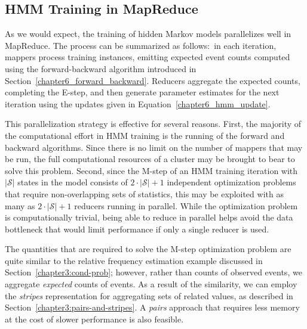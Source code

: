 \subsection{HMM Training in MapReduce}

As we would expect, the training of hidden Markov models parallelizes
well in MapReduce.  The process can be summarized as follows:\ in each
iteration, mappers process training instances, emitting expected event
counts computed using the forward-backward algorithm introduced in
Section~\ref{chapter6_forward_backward}.  Reducers aggregate the
expected counts, completing the E-step, and then generate parameter
estimates for the next iteration using the updates given in
Equation~\ref{chapter6_hmm_update}.

This parallelization strategy is effective for several reasons.
First, the majority of the computational effort in HMM training is the
running of the forward and backward algorithms.  Since there is no
limit on the number of mappers that may be run, the full computational
resources of a cluster may be brought to bear to solve this problem.
Second, since the M-step of an HMM training iteration with
$|\mathcal{S}|$ states in the model consists of $2\cdot |\mathcal{S}|
+ 1$ independent optimization problems that require non-overlapping
sets of statistics, this may be exploited with as many as $2\cdot
|\mathcal{S}| + 1$ reducers running in parallel.  While the
optimization problem is computationally trivial, being able to reduce
in parallel helps avoid the data bottleneck that would limit
performance if only a single reducer is used.

The quantities that are required to solve the M-step optimization
problem are quite similar to the relative frequency estimation example
discussed in Section~\ref{chapter3:cond-prob}; however, rather than
counts of observed events, we aggregate \emph{expected} counts of
events.  As a result of the similarity, we can employ the {\it
  stripes} representation for aggregating sets of related values, as
described in Section~\ref{chapter3:pairs-and-stripes}.  A {\it pairs}
approach that requires less memory at the cost of slower performance
is also feasible.

